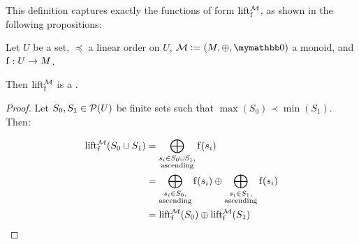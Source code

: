 This definition captures exactly the functions of form $\operatorname{lift_{\operatorname{f}}^{\mathcal{M}}}$, as shown in the following propositions:

\begin{proposition}
Let $U$ be a set, $\preceq$ a linear order on $U$, $\mathcal{M} \defeq (M, \groupaddsym, \neutraladd)$ a monoid, and ${\operatorname{f}}: {U} \rightarrow {M}$.

Then $\operatorname{lift_{\operatorname{f}}^{\mathcal{M}}}$ is a \somewhatmorphism.

\begin{proof}
Let $S_0, S_1 \in \mathcal{P}({U})$ be finite sets such that $\max(S_0) \prec \min(S_1)$. Then:

\begin{align*}
\operatorname{lift_{\operatorname{f}}^{\mathcal{M}}}(S_0 \cup S_1) &= \bigoplus_{\substack{s_i \in S_0 \cup S_1,\\ \text{ascending}}} \operatorname{f}(s_i)\\
&= \bigoplus_{\substack{s_i \in S_0,\\ \text{ascending}}} \operatorname{f}(s_i) \oplus \bigoplus_{\substack{s_i \in S_1,\\ \text{ascending}}} \operatorname{f}(s_i)\\
&= \operatorname{lift_{\operatorname{f}}^{\mathcal{M}}}(S_0) \oplus \operatorname{lift_{\operatorname{f}}^{\mathcal{M}}}(S_1)\\
\end{align*}
\end{proof}
\end{proposition}

